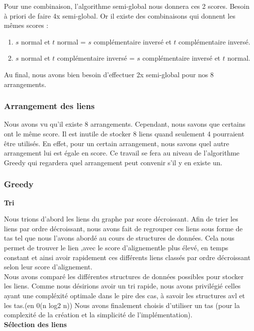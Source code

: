 \documentclass{article}
\begin{document}
Pour une combinaison, l'algorithme semi-global nous donnera ces 2 scores. Besoin à priori de faire 4x semi-global. Or il existe des combinaisons qui donnent les mêmes scores : 
\begin{enumerate}
\item $s$ normal et $t$ normal = $s$ complémentaire inversé et $t$ complémentaire inversé.
\item $s$ normal et $t$ complémentaire inversé = $s$ complémentaire inversé et $t$ normal.
\end{enumerate}
Au final, nous avons bien besoin d'effectuer 2x semi-global pour nos 8 arrangements.

\subsubsection{Arrangement des liens}
Nous avons vu qu'il existe 8 arrangements. Cependant, nous savons que certains ont le même score. Il est inutile de stocker 8 liens quand seulement 4 pourraient être utilisés. En effet, pour un certain arrangement, nous savons quel autre arrangement lui est égale en score. Ce travail se fera au niveau de l'algorithme Greedy qui regardera quel arrangement peut convenir s'il y en existe un. 
\subsubsection{Greedy}
\textbf{Tri}

\vspace{0.3mm}
Nous trions d'abord les liens du graphe par score décroissant. Afin de trier les liens par ordre décroissant, nous avons fait de regrouper ces liens sous forme de tas tel que nous l'avons abordé au cours de structures de données. Cela nous permet de trouver le lien ,avec le score d'alignementle plus élevé, en temps constant et ainsi avoir rapidement ces différents liens classés par ordre décroissant
selon leur score d'alignement.
\\

Nous avons comparé les différentes structures de données possibles pour stocker les liens. Comme nous désirions avoir un tri rapide, nous avons privilégié celles ayant une compléxité optimale dans le pire des cas, à savoir les structures avl et les tas.(en 0(n log2 n))
Nous avons finalement choisis d'utiliser un tas (pour la complexité de la création et la simplicité de l'implémentation).\\

\textbf{Sélection des liens}
\end{document}
